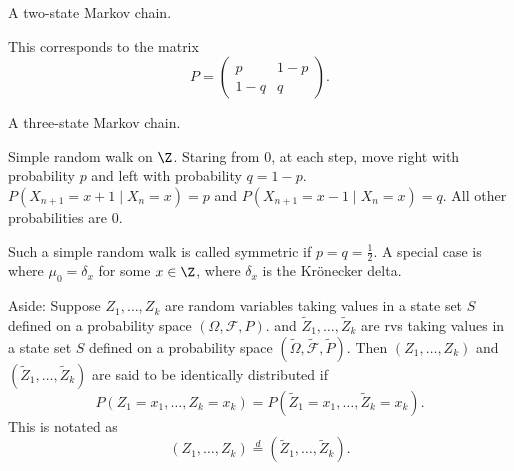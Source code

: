 \begin{examples}
    \item A two-state Markov chain.
    \begin{center}
    \end{center}
    This corresponds to the matrix \[
        P = \begin{pmatrix}
            p & 1-p \\
            1-q & q
        \end{pmatrix}.
    \]

    \item A three-state Markov chain.
    \begin{center}
    \end{center}

    \item Simple random walk on $\Z$.
    Staring from $0$, at each step, move right with probability $p$ and left
    with probability $q = 1-p$.
    $P(X_{n+1} = x + 1 \mid X_n = x) = p$ and
    $P(X_{n+1} = x - 1 \mid X_n = x) = q$.
    All other probabilities are $0$.

    Such a simple random walk is called symmetric if $p = q = \frac12$.
    A special case is where $\mu_0 = \delta_x$ for some $x \in \Z$, where
    $\delta_x$ is the Kr\"onecker delta.

    Aside: Suppose $Z_1, \dots, Z_k$ are random variables taking values in a
    state set $S$ defined on a probability space $(\Omega, \mathcal F, P)$.
    and $\tilde{Z}_1, \dots, \tilde{Z}_k$ are rvs taking values in a
    state set $S$ defined on a probability space
    $(\tilde{\Omega}, \tilde{\mathcal F}, \tilde{P})$.
    Then $(Z_1, \dots, Z_k)$ and $(\tilde{Z}_1, \dots, \tilde{Z}_k)$ are said to
    be identically distributed if \[
        P(Z_1 = x_1, \dots, Z_k = x_k)
        = P(\tilde{Z}_1 = x_1, \dots, \tilde{Z}_k = x_k).
    \] This is notated as \[
        (Z_1, \dots, Z_k) \stackrel{d}{=} (\tilde{Z}_1, \dots, \tilde{Z}_k).
    \]


\end{examples}
